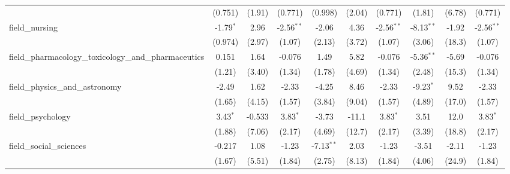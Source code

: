 \begin{tabular}{lccccccccc}
                                                               & (0.751)       & (1.91)        & (0.771)       & (0.998)        & (2.04)       & (0.771)       & (1.81)        & (6.78)         & (0.771)\\   
   field\_nursing                                              & -1.79$^{*}$   & 2.96          & -2.56$^{**}$  & -2.06          & 4.36         & -2.56$^{**}$  & -8.13$^{**}$  & -1.92          & -2.56$^{**}$\\   
                                                               & (0.974)       & (2.97)        & (1.07)        & (2.13)         & (3.72)       & (1.07)        & (3.06)        & (18.3)         & (1.07)\\   
   field\_pharmacology\_toxicology\_and\_pharmaceutics         & 0.151         & 1.64          & -0.076        & 1.49           & 5.82         & -0.076        & -5.36$^{**}$  & -5.69          & -0.076\\   
                                                               & (1.21)        & (3.40)        & (1.34)        & (1.78)         & (4.69)       & (1.34)        & (2.48)        & (15.3)         & (1.34)\\   
   field\_physics\_and\_astronomy                              & -2.49         & 1.62          & -2.33         & -4.25          & 8.46         & -2.33         & -9.23$^{*}$   & 9.52           & -2.33\\   
                                                               & (1.65)        & (4.15)        & (1.57)        & (3.84)         & (9.04)       & (1.57)        & (4.89)        & (17.0)         & (1.57)\\   
   field\_psychology                                           & 3.43$^{*}$    & -0.533        & 3.83$^{*}$    & -3.73          & -11.1        & 3.83$^{*}$    & 3.51          & 12.0           & 3.83$^{*}$\\   
                                                               & (1.88)        & (7.06)        & (2.17)        & (4.69)         & (12.7)       & (2.17)        & (3.39)        & (18.8)         & (2.17)\\   
   field\_social\_sciences                                     & -0.217        & 1.08          & -1.23         & -7.13$^{**}$   & 2.03         & -1.23         & -3.51         & -2.11          & -1.23\\   
                                                               & (1.67)        & (5.51)        & (1.84)        & (2.75)         & (8.13)       & (1.84)        & (4.06)        & (24.9)         & (1.84)\\   

\end{tabular}
